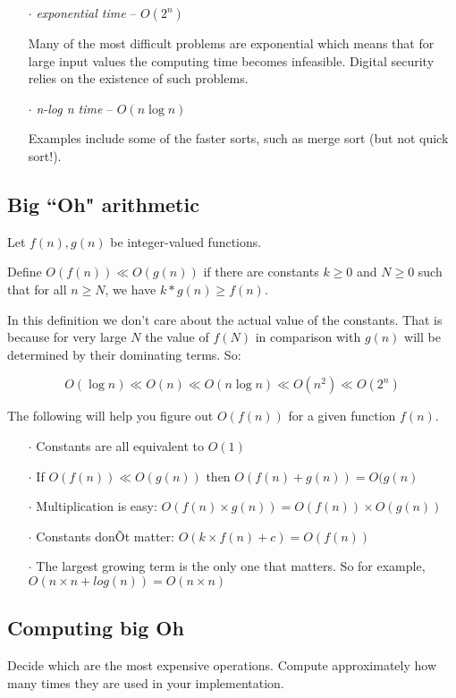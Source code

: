 \documentclass[twoside=false,DIV=14]{scrartcl}
\begin{document}
\begin{itemize}
\begin{itemize}
\item [$\cdot$]  \emph{exponential time}  -- $O(2^n)$

Many of the most difficult problems are exponential which means that for large input values the computing time becomes infeasible. Digital security relies on the existence of such problems.

\item [$\cdot$]  \emph{n-log n time}  -- $O(n\log n)$

Examples include some of the faster sorts, such as merge sort (but not quick sort!).
\end{itemize}

\subsection*{Big ``Oh" arithmetic} 
Let $f(n), g(n)$ be integer-valued functions.

Define $O(f(n)) \ll O(g(n))$ if there are constants $k\geq 0$ and $N\geq 0$ such that for all $n \geq N$,   we have $k*g(n) \geq  f(n)$.

In this definition we don't care about the actual value of the constants. That is because for very large $N$ the value of $f(N)$ in  comparison with $g(n)$ will be determined by their dominating terms. So:

$$ O(\log n) \ll  O( n) \ll  O(n\log n) \ll O(n^2) \ll O(2^n) $$

The following will help you figure out $O(f(n))$ for a given function $f(n)$.

\begin{itemize}
\item [$\cdot$] Constants are all equivalent to $O(1)$

\item [$\cdot$] If  $O(f(n)) \ll O(g(n))$ then $O(f(n) + g(n)) = O(g(n)$

\item [$\cdot$] Multiplication is easy:   $O(f(n) \times g(n)) = O(f(n)) \times O(g(n))$

\item [$\cdot$] Constants donÕt matter:   $O(k\times f(n)+c) = O(f(n))$

\item [$\cdot$] The largest growing term is
the only one that matters. So for example,   $O(n\times n + log(n)) = O(n\times n)$
\end{itemize} 

\subsection*{Computing big Oh}
Decide which are the most expensive operations.
Compute approximately how many times they are used in your implementation.


\end{itemize}
\end{document}
